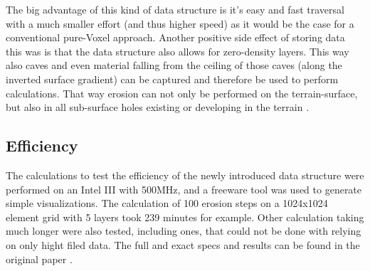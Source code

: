The big advantage of this kind of data structure is it's easy and fast traversal with a much smaller effort (and thus higher speed) as it would be the case for a conventional pure-Voxel approach. Another positive side effect of storing data this was is that the data structure also allows for zero-density layers. This way also caves and even material falling from the ceiling of those caves (along the inverted surface gradient) can be captured and therefore be used to perform calculations. That way erosion can not only be performed on the terrain-surface, but also in all sub-surface holes existing or developing in the terrain \cite{marechal2010heat}.

\subsection{Efficiency}
The calculations to test the efficiency of the newly introduced data structure were performed on an Intel III with 500MHz, and a freeware tool was used to generate simple visualizations. The calculation of 100 erosion steps on a 1024x1024 element grid with 5 layers took 239 minutes for example. Other calculation taking much longer were also tested, including ones, that could not be done with relying on only hight filed data. The full and exact specs and results can be found in the original paper \cite{marechal2010heat}.